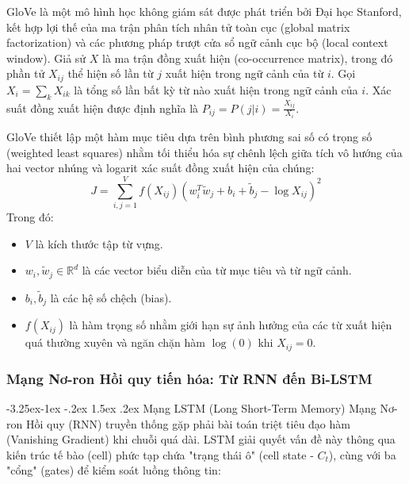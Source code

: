 \documentclass[a4paper]{article}
\makeatletter
\theoremstyle{definition}
\newcounter {subsubsubsection}[subsubsection]
\newcommand\subsubsubsection{\@startsection{subsubsubsection}{4}{\z@}%
                                     {-3.25ex\@plus -1ex \@minus -.2ex}%
                                     {1.5ex \@plus .2ex}%
                                     {\normalfont\normalsize\bfseries}}
\makeatother
\begin{document}
GloVe là một mô hình học không giám sát được phát triển bởi Đại học Stanford, kết hợp lợi thế của ma trận phân tích nhân tử toàn cục (global matrix factorization) và các phương pháp trượt cửa sổ ngữ cảnh cục bộ (local context window). Giả sử $X$ là ma trận đồng xuất hiện (co-occurrence matrix), trong đó phần tử $X_{ij}$ thể hiện số lần từ $j$ xuất hiện trong ngữ cảnh của từ $i$. Gọi $X_i = \sum_k X_{ik}$ là tổng số lần bất kỳ từ nào xuất hiện trong ngữ cảnh của $i$. Xác suất đồng xuất hiện được định nghĩa là $P_{ij} = P(j|i) = \frac{X_{ij}}{X_i}$.

GloVe thiết lập một hàm mục tiêu dựa trên bình phương sai số có trọng số (weighted least squares) nhằm tối thiểu hóa sự chênh lệch giữa tích vô hướng của hai vector nhúng và logarit xác suất đồng xuất hiện của chúng:
\begin{equation}
	J = \sum_{i,j=1}^{V} f(X_{ij}) \left( w_i^T \tilde{w}_j + b_i + \tilde{b}_j - \log X_{ij} \right)^2
\end{equation}
Trong đó:
\begin{itemize}
	\item $V$ là kích thước tập từ vựng.
	\item $w_i, \tilde{w}_j \in \mathbb{R}^d$ là các vector biểu diễn của từ mục tiêu và từ ngữ cảnh.
	\item $b_i, \tilde{b}_j$ là các hệ số chệch (bias).
	\item $f(X_{ij})$ là hàm trọng số nhằm giới hạn sự ảnh hưởng của các từ xuất hiện quá thường xuyên và ngăn chặn hàm $\log(0)$ khi $X_{ij} = 0$.
\end{itemize}

\subsubsection{Mạng Nơ-ron Hồi quy tiến hóa: Từ RNN đến Bi-LSTM}

\subsubsubsection{Mạng LSTM (Long Short-Term Memory)}
Mạng Nơ-ron Hồi quy (RNN) truyền thống gặp phải bài toán triệt tiêu đạo hàm (Vanishing Gradient) khi chuỗi quá dài. LSTM giải quyết vấn đề này thông qua kiến trúc tế bào (cell) phức tạp chứa "trạng thái ô" (cell state - $C_t$), cùng với ba "cổng" (gates) để kiểm soát luồng thông tin:
\end{document}
